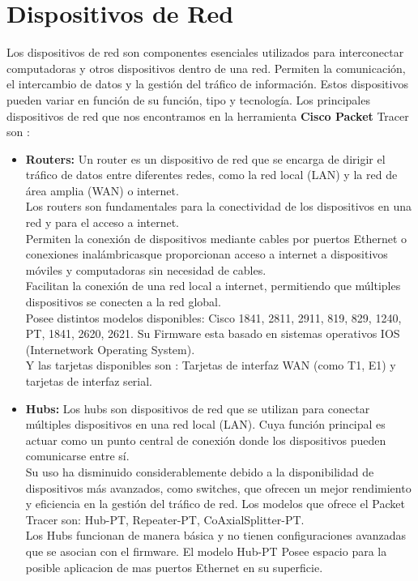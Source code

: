 \documentclass{article}
\begin{document}
\section{Dispositivos de Red}
Los dispositivos de red son componentes esenciales utilizados para interconectar computadoras y otros dispositivos dentro de una red. Permiten la comunicación, el intercambio de datos y la gestión del tráfico de información. Estos dispositivos pueden variar en función de su función, tipo y tecnología. Los principales dispositivos de red que nos encontramos en la herramienta \textbf{Cisco Packet} Tracer son :
    \begin{itemize}
        \item \textbf{Routers:} Un router es un dispositivo de red que se encarga de dirigir el tráfico de datos entre diferentes redes, como la red local (LAN) y la red de área amplia (WAN) o internet. \\ Los routers son fundamentales para la conectividad de los dispositivos en una red y para el acceso a internet. \\ Permiten la conexión de dispositivos mediante cables por puertos Ethernet o conexiones inalámbricasque proporcionan acceso a internet a dispositivos móviles y computadoras sin necesidad de cables. \\
        Facilitan la conexión de una red local a internet, permitiendo que múltiples dispositivos se conecten a la red global. \\ Posee distintos modelos disponibles: Cisco 1841, 2811, 2911, 819, 829, 1240, PT, 1841, 2620, 2621. Su Firmware esta basado en sistemas operativos IOS (Internetwork Operating System). 
        \\ Y las tarjetas disponibles son : Tarjetas de interfaz WAN (como T1, E1) y 
        tarjetas de interfaz serial.
        
         \item \textbf{Hubs:} Los hubs son dispositivos de red que se utilizan para conectar múltiples dispositivos en una red local (LAN). Cuya función principal es actuar como un punto central de conexión donde los dispositivos pueden comunicarse entre sí. 
         \\ Su uso ha disminuido considerablemente debido a la disponibilidad de dispositivos más avanzados, como switches, que ofrecen un mejor rendimiento y eficiencia en la gestión del tráfico de red. Los modelos que ofrece el Packet Tracer son: Hub-PT, Repeater-PT, CoAxialSplitter-PT.\\ Los Hubs funcionan de manera básica y no tienen configuraciones avanzadas que se asocian con el firmware. El modelo Hub-PT Posee espacio para la posible aplicacion de mas puertos Ethernet en su superficie.
        

\end{itemize}
\end{document}
